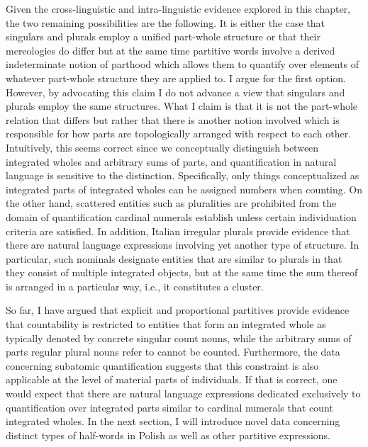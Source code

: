 Given the cross-linguistic and intra-linguistic evidence explored in this chapter, the two remaining possibilities are the following. It is either the case that singulars and plurals employ a unified part-whole structure or that their mereologies do differ but at the same time partitive words involve a derived indeterminate notion of parthood which allows them to quantify over elements of whatever part-whole structure they are applied to. I argue for the first option. However, by advocating this claim I do not advance a view that singulars and plurals employ the same structures. What I claim is that it is not the part-whole relation that differs but rather that there is another notion involved which is responsible for how parts are topologically arranged with respect to each other. Intuitively, this seems correct since we conceptually distinguish between integrated wholes and arbitrary sums of parts, and quantification in natural language is sensitive to the distinction. Specifically, only things conceptualized as integrated parts of integrated wholes can be assigned numbers when counting. On the other hand, scattered entities such as pluralities are prohibited from the domain of quantification cardinal numerals establish unless certain individuation criteria are satisfied. In addition, Italian irregular plurals provide evidence that there are natural language expressions involving yet another type of structure. In particular, such nominals designate entities that are similar to plurals in that they consist of multiple integrated objects, but at the same time the sum thereof is arranged in a particular way, i.e., it constitutes a cluster.

So far, I have argued that explicit and proportional partitives provide evidence that countability is restricted to entities that form an integrated whole as typically denoted by concrete singular count nouns, while the arbitrary sums of parts regular plural nouns refer to cannot be counted. Furthermore, the data concerning subatomic quantification suggests that this constraint is also applicable at the level of material parts of individuals. If that is correct, one would expect that there are natural language expressions dedicated exclusively to quantification over integrated parts similar to cardinal numerals that count integrated wholes. In the next section, I will introduce novel data concerning distinct types of half-words in Polish as well as other partitive expressions.
